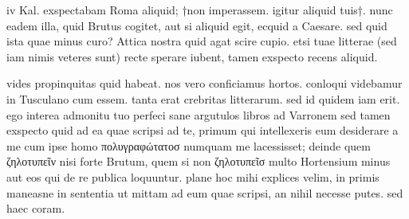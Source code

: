 


 iv Kal. exspectabam Roma aliquid; †non imperassem. igitur aliquid tuis†. nunc eadem illa, quid Brutus cogitet, aut si aliquid egit, ecquid a Caesare. sed quid ista quae minus curo? Attica nostra quid agat scire cupio. etsi tuae litterae (sed iam nimis veteres sunt) recte sperare iubent, tamen exspecto recens aliquid.

 vides propinquitas quid habeat. nos vero conficiamus hortos. conloqui videbamur in Tusculano cum essem. tanta erat crebritas litterarum. sed id quidem iam erit. ego interea admonitu tuo perfeci sane argutulos libros ad Varronem sed tamen exspecto quid ad ea quae scripsi ad te, primum qui intellexeris eum desiderare a me cum ipse homo πολυγραφώτατοσ numquam me lacessisset; deinde quem ζηλοτυπεῖν nisi forte Brutum, quem si non ζηλοτυπεῖσ multo Hortensium minus aut eos qui de re publica loquuntur. plane hoc mihi explices velim, in primis maneasne in sententia ut mittam ad eum quae scripsi, an nihil necesse putes. sed haec coram.
